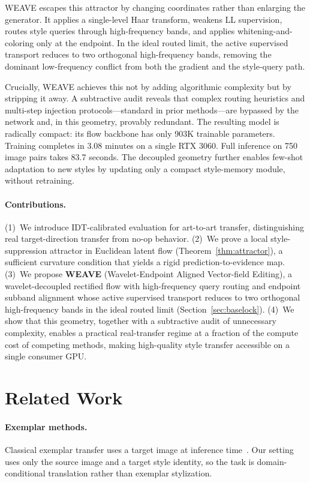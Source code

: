 \documentclass[letterpaper]{article}
\begin{document}
WEAVE escapes this attractor by changing coordinates rather than enlarging the generator.
It applies a single-level Haar transform, weakens LL supervision, routes style queries through high-frequency bands, and applies whitening-and-coloring only at the endpoint.
In the ideal routed limit, the active supervised transport reduces to two orthogonal high-frequency bands, removing the dominant low-frequency conflict from both the gradient and the style-query path.

Crucially, WEAVE achieves this not by adding algorithmic complexity but by stripping it away.
A subtractive audit reveals that complex routing heuristics and multi-step injection protocols---standard in prior methods---are bypassed by the network and, in this geometry, provably redundant.
The resulting model is radically compact: its flow backbone has only 903K trainable parameters.
Training completes in 3.08 minutes on a single RTX 3060.
Full inference on 750 image pairs takes 83.7 seconds.
The decoupled geometry further enables few-shot adaptation to new styles by updating only a compact style-memory module, without retraining.

\paragraph{Contributions.}
(1)~We introduce IDT-calibrated evaluation for art-to-art transfer, distinguishing real target-direction transfer from no-op behavior.
(2)~We prove a local style-suppression attractor in Euclidean latent flow (Theorem~\ref{thm:attractor}), a sufficient curvature condition that yields a rigid prediction-to-evidence map.
(3)~We propose \textbf{WEAVE} (Wavelet-Endpoint Aligned Vector-field Editing), a wavelet-decoupled rectified flow with high-frequency query routing and endpoint subband alignment whose active supervised transport reduces to two orthogonal high-frequency bands in the ideal routed limit (Section~\ref{sec:baselock}).
(4)~We show that this geometry, together with a subtractive audit of unnecessary complexity, enables a practical real-transfer regime at a fraction of the compute cost of competing methods, making high-quality style transfer accessible on a single consumer GPU.

\section{Related Work}
\label{sec:related}

\paragraph{Exemplar methods.}
Classical exemplar transfer uses a target image at inference time~\cite{gatys2015neural,gatys2016image,huang2017adain,li2017universal,deng2022stytr2,huang2024aesfa}.
Our setting uses only the source image and a target style identity, so the task is domain-conditional translation rather than exemplar stylization.
\end{document}

